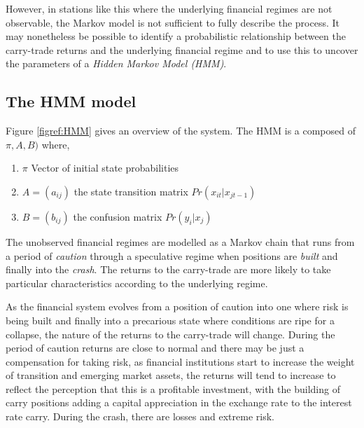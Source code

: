 \documentclass[12pt, a4paper, oneside]{article} %
\begin{document}
However, in stations like this where the underlying financial regimes are not observable, the Markov model is not sufficient to fully describe the process. It may nonetheless be possible to identify a probabilistic relationship between the carry-trade returns and the underlying financial regime and to use this to uncover the parameters of a \emph{Hidden Markov Model (HMM)}. 
 
\subsection{The HMM model}
Figure \ref{figref:HMM} gives an overview of the system.  The HMM is a composed of $\pi, A, B)$ where,

\begin{enumerate}
\item $\pi$ Vector of initial state probabilities
\item $A = (a_{ij})$ the state transition matrix $Pr(x_{it}|x_{jt-1})$
\item $B = (b_{ij})$ the confusion matrix $Pr(y_i|x_j)$
\end{enumerate}

The unobserved financial regimes are modelled as a Markov chain that runs from a period of \emph{caution} through a speculative regime when positions are \emph{built} and finally into the \emph{crash}.  The returns to the carry-trade are more likely to take particular characteristics according to the underlying regime.   

As the financial system evolves from a position of caution into one where risk is being built and finally into a precarious state where conditions are ripe for a collapse, the nature of the returns to the carry-trade will change. During the period of caution returns are close to normal and there may be just a compensation for taking risk, as financial institutions start to increase the weight of transition and emerging market assets, the returns will tend to increase to reflect the perception that this is a profitable investment, with the building of carry positions adding a capital appreciation in the exchange rate to the interest rate carry. During the crash, there are losses and extreme risk.   
 
\end{document}
